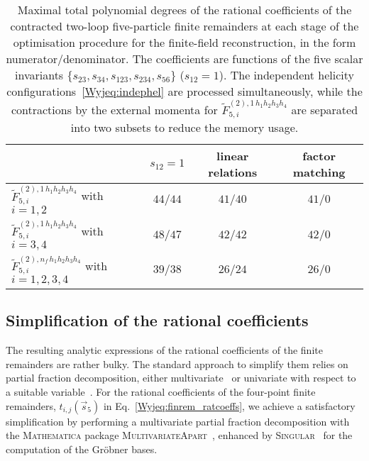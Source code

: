 \documentclass[main.tex]{subfiles}
\begin{document}
\begin{table}[t!]
\begin{center}
\begin{tabular}{l|c|c|c}
 & $s_{12}=1$ & linear relations & factor matching \\
\hline
$\tilde{F}_{5,i}^{(2),1\, h_1 h_2 h_3 h_4}$ with $i=1,2$     & $44/44$ & $41/40$ & $41/0$ \\
$\tilde{F}_{5,i}^{(2),1\, h_1 h_2 h_3 h_4}$ with $i=3,4$     & $48/47$ & $42/42$ & $42/0$ \\
$\tilde{F}_{5,i}^{(2),n_f\, h_1 h_2 h_3 h_4}$ with $i=1,2,3,4$ & $39/38$ & $26/24$ & $26/0$ \\
\end{tabular}
\end{center}
\caption{Maximal total polynomial degrees of the rational coefficients of the contracted two-loop five-particle finite remainders at each stage of the optimisation procedure for the finite-field reconstruction, in the form numerator/denominator. The coefficients are  functions of the five scalar invariants $\{s_{23},s_{34},s_{123},s_{234},s_{56}\}$ ($s_{12}=1$). The independent helicity configurations~\eqref{Wyjeq:indephel} are processed simultaneously, while the contractions by the external momenta for $\tilde{F}_{5,i}^{(2),1\, h_1 h_2 h_3 h_4}$ are separated into two subsets to reduce the memory usage.}
\label{Wyjtab:degrees}
\end{table}
\subsection{Simplification of the rational coefficients}
\label{wyjsec:Simplification}
The resulting analytic expressions of the rational coefficients of the finite remainders are rather bulky. The standard approach to simplify them relies on partial fraction decomposition, either multivariate~\cite{Leinartas:1978,Pak:2011xt,Raichev:2012,Abreu:2019odu,Boehm:2020ijp,Heller:2021qkz,Bendle:2021ueg} or univariate with respect to a suitable variable~\cite{Badger:2021nhg,Badger:2021imn,Badger:2021ega,Abreu:2021asb}. For the rational coefficients of the four-point finite remainders, $t_{i,j}\left(\vec{s}_5\right)$ in Eq.~\eqref{Wyjeq:finrem_ratcoeffs}, we achieve a satisfactory simplification by performing a multivariate partial fraction decomposition with the \textsc{Mathematica} package \textsc{MultivariateApart}~\cite{Heller:2021qkz}, enhanced by \textsc{Singular}~\cite{DGPS} for the computation of the Gr\"obner bases. 
\end{document}
